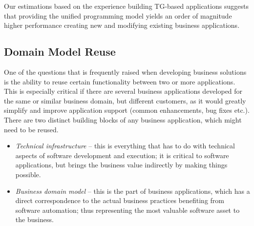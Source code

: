   Our estimations based on the experience building TG-based applications suggests that providing the unified programming model yields an order of magnitude higher performance creating new and modifying existing business applications.

\subsection{Domain Model Reuse}
  One of the questions that is frequently raised when developing business solutions is the ability to reuse certain functionality between two or more applications.
  This is especially critical if there are several business applications developed for the same or similar business domain, but different customers, as it would greatly simplify and improve application support (common enhancements, bug fixes etc.).
  There are two distinct building blocks of any business application, which might need to be reused.
  \begin{itemize}
   \item \emph{Technical infrastructure} -- this is everything that has to do with technical aspects of software development and execution; it is critical to software applications, but brings the business value indirectly by making things possible.
    \item \emph{Business domain model} --  this is the part of business applications, which has a direct correspondence to the actual business practices benefiting from software automation; thus representing the most valuable software asset to the business.
  \end{itemize}


